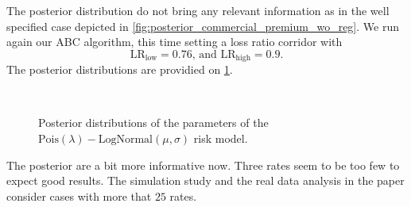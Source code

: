 \documentclass[10pt]{article}
\begin{document}
The posterior distribution do not bring any relevant information as in the well specified case depicted in \cref{fig:posterior_commercial_premium_wo_reg}.  We run again our ABC algorithm, this time setting a loss ratio corridor with 
$$
\text{LR}_{\text{low}} = 0.76\text{, and }\text{LR}_{\text{high}} = 0.9. 
$$
The posterior distributions are providied on \cref{fig:posterior_commercial_premium_w_reg_miss}. 
\begin{figure}[!ht]
  \begin{center}
    \\
    \caption{Posterior distributions of the parameters of the $\text{Pois}(\lambda)-\text{LogNormal}(\mu , \sigma)$ risk model.}
    \label{fig:posterior_commercial_premium_w_reg_miss}
  \end{center}
\end{figure}

The posterior are a bit more informative now. Three rates seem to be too few to expect good results. The simulation study and the real data analysis in the paper consider cases with more that $25$ rates. 


\end{document}
